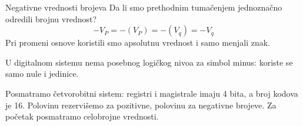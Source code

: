 \begin{frame}[label=04-s028]{Negativne vrednosti brojeva}
Da li smo prethodnim tumačenjem jednoznačno odredili brojnu vrednost?
\[-V_P=-(V_P)=-(V_q)=-V_q\]
Pri promeni osnove koristili smo apsolutnu vrednost i samo menjali znak.\par
U digitalnom sistemu \alert{nema posebnog logičkog nivoa za simbol minus}: koriste se samo nule i jedinice.
\par\vspace{3mm}
Posmatramo četvorobitni sistem: registri i magistrale imaju 4 bita, a broj kodova je 16. Polovinu rezervišemo za pozitivne, polovinu za negativne brojeve. Za početak posmatramo celobrojne vrednosti.
\end{frame}
